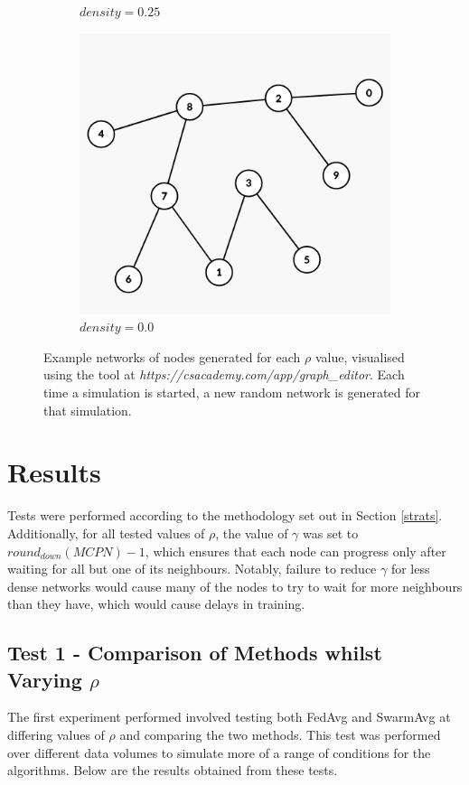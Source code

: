 \documentclass[letterpaper, 10 pt, conference]{ieeeconf}  %
\begin{document}
\begin{figure}[H]
\begin{subfigure}[b]{0.15\textwidth}
		\caption{$density=0.25$}
	\end{subfigure}
	\begin{subfigure}[b]{0.15\textwidth}
		\centering
		\includegraphics[width=\textwidth]{sparsegraph0}
		\caption{$density=0.0$}
	\end{subfigure}
	\caption{Example networks of nodes generated for each $\rho$ value, visualised using the tool at \emph{https://csacademy.com/app/graph\_editor}. Each time a simulation is started, a new random network is generated for that simulation. \label{densefig}}
{}\end{figure}

\section{Results}
Tests were performed according to the methodology set out in Section \ref{strats}. Additionally, for all tested values of $\rho$, the value of $\gamma$ was set to $round_{down}(MCPN) - 1$, which ensures that each node can progress only after waiting for all but one of its neighbours. Notably, failure to reduce $\gamma$ for less dense networks would cause many of the nodes to try to wait for more neighbours than they have, which would cause delays in training.

\subsection{Test 1 - Comparison of Methods whilst Varying $\rho$}
The first experiment performed involved testing both FedAvg and SwarmAvg at differing values of $\rho$ and comparing the two methods. This test was performed over different data volumes to simulate more of a range of conditions for the algorithms. Below are the results obtained from these tests.
\end{document}
